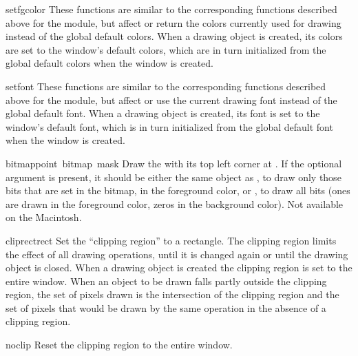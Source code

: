 \begin{funcdesc}{setfgcolor}{}
These functions are similar to the corresponding functions described
above for the
module, but affect or return the colors currently used for drawing
instead of the global default colors.
When a drawing object is created, its colors are set to the window's
default colors, which are in turn initialized from the global default
colors when the window is created.
\end{funcdesc}

\begin{funcdesc}{setfont}{}
These functions are similar to the corresponding functions described
above for the
module, but affect or use the current drawing font instead of
the global default font.
When a drawing object is created, its font is set to the window's
default font, which is in turn initialized from the global default
font when the window is created.
\end{funcdesc}

\begin{funcdesc}{bitmap}{point\, bitmap\, mask}
Draw the  with its top left corner at .
If the optional  argument is present, it should be either
the same object as , to draw only those bits that are set
in the bitmap, in the foreground color, or , to draw all
bits (ones are drawn in the foreground color, zeros in the background
color).
Not available on the Macintosh.
\end{funcdesc}

\begin{funcdesc}{cliprect}{rect}
Set the ``clipping region'' to a rectangle.
The clipping region limits the effect of all drawing operations, until
it is changed again or until the drawing object is closed.  When a
drawing object is created the clipping region is set to the entire
window.  When an object to be drawn falls partly outside the clipping
region, the set of pixels drawn is the intersection of the clipping
region and the set of pixels that would be drawn by the same operation
in the absence of a clipping region.
\end{funcdesc}

\begin{funcdesc}{noclip}{}
Reset the clipping region to the entire window.
\end{funcdesc}

